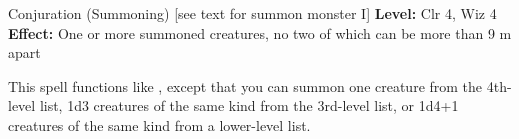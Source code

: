 {Conjuration (Summoning) [see text for summon monster I]}
{
	\textbf{Level:}
	Clr 4, Wiz 4\\
	\textbf{Effect:}
	One or more summoned creatures, no two of which can be more than 9 m apart\\
}
{
	This spell functions like , except that you can summon one creature from the 4th-level list, 1d3 creatures of the same kind from the 3rd-level list, or 1d4+1 creatures of the same kind from a lower-level list.

}

